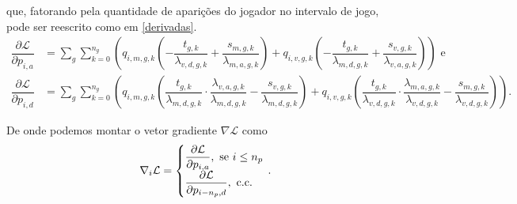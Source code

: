 \noindent que, fatorando pela quantidade de aparições do jogador no intervalo de jogo, pode ser reescrito como em \ref{derivadas}.
\begin{equation}
    \begin{split}
        \dfrac{\partial \mathcal{L}}{\partial p_{i, a}} & = \sum_{g}\sum_{k = 0}^{n_g} \left(q_{i, m, g, k}\left(- \dfrac{t_{g, k}}{\lambda_{v, d, g, k}} + \dfrac{s_{m, g, k}}{\lambda_{m, a, g, k}}\right) + q_{i, v, g, k}\left(- \dfrac{t_{g, k}}{\lambda_{m, d, g, k}} + \dfrac{s_{v, g, k}}{\lambda_{v, a, g, k}}\right)\right) \text { e} \\
        \dfrac{\partial \mathcal{L}}{\partial p_{i, d}} & = \sum_{g}\sum_{k = 0}^{n_g} \left(q_{i, m, g, k}\left(\dfrac{t_{g, k}}{\lambda_{m, d, g, k}}\cdot \dfrac{\lambda_{v, a, g, k}}{\lambda_{m, d, g, k}} - \dfrac{s_{v, g, k}}{\lambda_{m, d, g, k}}\right) + q_{i, v, g, k}\left(\dfrac{t_{g, k}}{\lambda_{v, d, g, k}}\cdot \dfrac{\lambda_{m, a, g, k}}{\lambda_{v, d, g, k}} - \dfrac{s_{m, g, k}}{\lambda_{v, d, g, k}}\right)\right).
    \end{split}
    \label{derivadas}
\end{equation}

De onde podemos montar o vetor gradiente $\nabla \mathcal{L}$ como
\begin{equation*}
    \nabla_i \mathcal{L} = 
    \left\{
        \begin{array}{@{}l@{}}
            \dfrac{\partial \mathcal{L}}{\partial p_{i, a}}, \text{ se } i \leq n_p\\
            \dfrac{\partial \mathcal{L}}{\partial p_{i - n_p, d}}, \text{ c.c.}
        \end{array}
    \right.\,.
\end{equation*}

